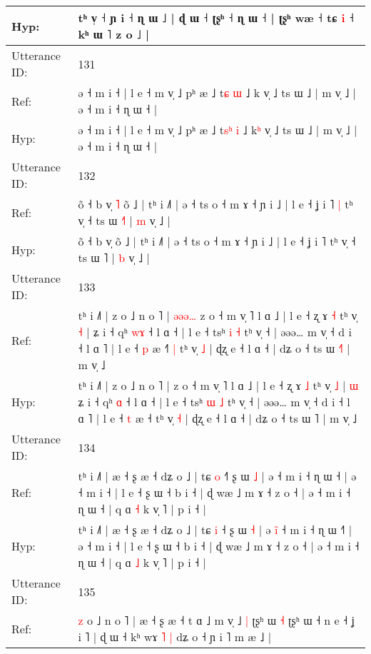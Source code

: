 \documentclass[10pt]{article}
\DeclareRobustCommand{\hl}[1]{{\textcolor{red}{#1}}}
\begin{document}
\begin{longtable}{ll}
 \\
Hyp: & tʰ v̩ ˧ ɲ i ˧ ɳ ɯ ˩ | ɖ ɯ ˧ ʈʂʰ\hl{}\hl{}\hl{} ˧ ɳ ɯ ˧ | ʈʂʰ wæ ˧ tɕ \hl{i} ˧ kʰ ɯ ˥ z o ˩ |
 \\
\midrule
Utterance ID: & 131 \\
Ref: & ə ˧ m i ˧ | l e ˧ m v̩ ˩ pʰ æ ˩ t\hl{}\hl{ɕ} \hl{ɯ} ˩ k\hl{} v̩ ˩ ts ɯ ˩ | m v̩ ˩ | ə ˧ m i ˧ ɳ ɯ ˧ |
 \\
Hyp: & ə ˧ m i ˧ | l e ˧ m v̩ ˩ pʰ æ ˩ t\hl{s}\hl{ʰ} \hl{i} ˩ k\hl{ʰ} v̩ ˩ ts ɯ ˩ | m v̩ ˩ | ə ˧ m i ˧ ɳ ɯ ˧ |
 \\
\midrule
Utterance ID: & 132 \\
Ref: & õ ˧ b v̩\hl{ }\hl{˥} õ ˩ | tʰ i ˩˥ | ə ˧ ts o ˧ m ɤ ˧ ɲ i ˩ | l e ˧ ʝ i ˥\hl{ }\hl{|} tʰ v̩ ˧ ts ɯ \hl{˧}˥ | \hl{m} v̩ ˩ |
 \\
Hyp: & õ ˧ b v̩\hl{}\hl{} õ ˩ | tʰ i ˩˥ | ə ˧ ts o ˧ m ɤ ˧ ɲ i ˩ | l e ˧ ʝ i ˥\hl{}\hl{} tʰ v̩ ˧ ts ɯ \hl{}˥ | \hl{b} v̩ ˩ |
 \\
\midrule
Utterance ID: & 133 \\
Ref: & tʰ i ˩˥ | z o ˩ n o ˥ |\hl{ }\hl{ə}\hl{ə}\hl{ə}\hl{…} z o ˧ m v̩ ˥ l ɑ ˩ | l e ˧ ʐ ɤ \hl{˧} tʰ v̩ \hl{˧} |\hl{}\hl{} ʑ i ˧ qʰ \hl{w}\hl{ɤ} ˧ l ɑ ˧ | l e ˧ tsʰ \hl{i} \hl{˧} tʰ v̩ ˧ | əəə… m v̩ ˧ d i ˧ l ɑ ˥ | l e ˧ \hl{p} æ ˧\hl{˥}\hl{ }\hl{|} tʰ v̩ \hl{˩} | ɖʐ e ˧ l ɑ ˧ | dʑ o ˧ ts ɯ \hl{˧}˥ | m v̩ ˩
 \\
Hyp: & tʰ i ˩˥ | z o ˩ n o ˥ |\hl{}\hl{}\hl{}\hl{}\hl{} z o ˧ m v̩ ˥ l ɑ ˩ | l e ˧ ʐ ɤ \hl{˩} tʰ v̩ \hl{˩} |\hl{ }\hl{ɯ} ʑ i ˧ qʰ \hl{}\hl{ɑ} ˧ l ɑ ˧ | l e ˧ tsʰ \hl{ɯ} \hl{˩} tʰ v̩ ˧ | əəə… m v̩ ˧ d i ˧ l ɑ ˥ | l e ˧ \hl{t} æ ˧\hl{}\hl{}\hl{} tʰ v̩ \hl{˧} | ɖʐ e ˧ l ɑ ˧ | dʑ o ˧ ts ɯ \hl{}˥ | m v̩ ˩
 \\
\midrule
Utterance ID: & 134 \\
Ref: & tʰ i ˩˥ | æ ˧ ʂ æ ˧ dʑ o ˩ | tɕ \hl{o} ˧\hl{˥} ʂ ɯ \hl{˩} | ə\hl{}\hl{}\hl{} ˧ m i ˧ ɳ ɯ ˧\hl{} | ə ˧ m i ˧ | l e ˧ ʂ ɯ ˧ b i ˧ | ɖ wæ ˩ m ɤ ˧ z o ˧ | ə ˧ m i ˧ ɳ ɯ ˧ | q ɑ \hl{˧} k v̩ ˥ | p i ˧ |
 \\
Hyp: & tʰ i ˩˥ | æ ˧ ʂ æ ˧ dʑ o ˩ | tɕ \hl{i} ˧\hl{} ʂ ɯ \hl{˧} | ə\hl{ }\hl{i}\hl{̃} ˧ m i ˧ ɳ ɯ ˧\hl{˥} | ə ˧ m i ˧ | l e ˧ ʂ ɯ ˧ b i ˧ | ɖ wæ ˩ m ɤ ˧ z o ˧ | ə ˧ m i ˧ ɳ ɯ ˧ | q ɑ \hl{˩} k v̩ ˥ | p i ˧ |
 \\
\midrule
Utterance ID: & 135 \\
Ref: & \hl{z} o ˩ n o ˥ | æ ˧ ʂ æ ˧ t ɑ ˩ m v̩ ˩\hl{ }\hl{|} ʈʂʰ ɯ\hl{}\hl{} \hl{˧} ʈʂʰ ɯ ˧ n e ˧ ʝ i ˥ | ɖ ɯ ˧ kʰ wɤ\hl{ }\hl{˥} \hl{|} dʑ o ˧ ɲ i ˥ m æ ˩ |
 \\

\end{longtable}
\end{document}
